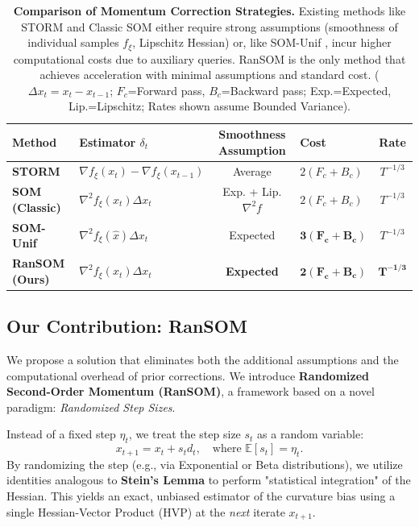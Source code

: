 \documentclass{article}
\theoremstyle{plain}
\theoremstyle{definition}
\theoremstyle{remark}
\begin{document}
\begin{table}[ht]
\centering
\small
\setlength{\tabcolsep}{4pt}
\caption{\textbf{Comparison of Momentum Correction Strategies.} Existing methods like STORM \cite{cutkosky2019storm} and Classic SOM \cite{tran2022better} either require strong assumptions (smoothness of individual samples $f_\xi$, Lipschitz Hessian) or, like SOM-Unif \cite{zhang2020one, salehkaleybar2022momentum}, incur higher computational costs due to auxiliary queries. RanSOM is the only method that achieves acceleration with minimal assumptions and standard cost. ($\Delta x_t = x_t - x_{t-1}$; $F_c$=Forward pass, $B_c$=Backward pass; Exp.=Expected, Lip.=Lipschitz; Rates shown assume Bounded Variance).}
\label{tab:comparison}
\begin{tabular}{@{}llclc@{}}
\toprule
\textbf{Method} & \textbf{Estimator $\delta_t$} & \textbf{Smoothness Assumption} & \textbf{Cost} & \textbf{Rate} \\
\midrule
\textbf{STORM} & $\nabla f_\xi(x_t) - \nabla f_\xi(x_{t-1})$ & Average & $2(F_c+B_c)$ & $T^{-1/3}$ \\
\textbf{SOM (Classic)} & $\nabla^2 f_\xi(x_{t}) \Delta x_t$ & Exp. + Lip. $\nabla^2 f$ & $2(F_c+B_c)$ & $T^{-1/3}$ \\
\textbf{SOM-Unif} & $\nabla^2 f_\xi(\hat{x}) \Delta x_t$ & Expected & $\mathbf{3(F_c+B_c)}$ & $T^{-1/3}$ \\
\midrule
\textbf{RanSOM (Ours)} & $\nabla^2 f_\xi(x_t) \Delta x_t$ & \textbf{Expected} & $\mathbf{2(F_c+B_c)}$ & $\mathbf{T^{-1/3}}$ \\
\bottomrule
\end{tabular}
\end{table}

\subsection{Our Contribution: RanSOM}
We propose a solution that eliminates both the additional assumptions and the computational overhead of prior corrections. We introduce \textbf{Randomized Second-Order Momentum (RanSOM)}, a framework based on a novel paradigm: \textit{Randomized Step Sizes}.

Instead of a fixed step $\eta_t$, we treat the step size $s_t$ as a random variable:
\begin{equation*}
    x_{t+1} = x_t + s_t d_t, \quad \text{where } \mathbb{E}[s_t] = \eta_t.
\end{equation*}
By randomizing the step (e.g., via Exponential or Beta distributions), we utilize identities analogous to \textbf{Stein's Lemma} to perform "statistical integration" of the Hessian. This yields an exact, unbiased estimator of the curvature bias using a single Hessian-Vector Product (HVP) at the \textit{next} iterate $x_{t+1}$.
\end{document}
